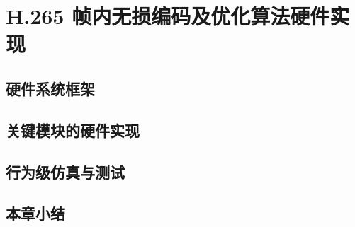 \chapter{H.265 帧内无损编码及优化算法硬件实现}
\label{cha:c4}

\section{硬件系统框架}

\section{关键模块的硬件实现}

\section{行为级仿真与测试}

\section{本章小结}